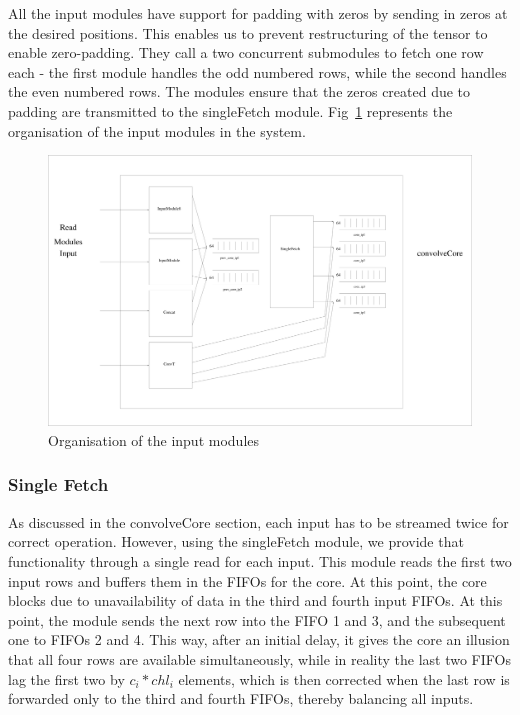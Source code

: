 \documentclass[a4paper,12pt, final]{report}
\begin{document}
All the input modules have support for padding with zeros by sending in zeros at the desired positions. This enables us to prevent restructuring of the tensor to enable zero-padding. They call a two concurrent submodules to fetch one row each - the first module handles the odd numbered rows, while the second handles the even numbered rows. The modules ensure that the zeros created due to padding are transmitted to the singleFetch module. Fig~\ref{fig:inputModules} represents the organisation of the input modules in the system.


\begin{figure}[h!]
    \centering
    \includegraphics[width=\textwidth]{inputModule.pdf}
    \caption{Organisation of the input modules}
    \label{fig:inputModules}
\end{figure}

\subsubsection{Single Fetch}

As discussed in the convolveCore section, each input has to be streamed twice for correct operation. However, using the singleFetch module, we provide that functionality through a single read for each input. This module reads the first two input rows and buffers them in the FIFOs for the core. At this point, the core blocks due to unavailability of data in the third and fourth input FIFOs. At this point, the module sends the next row into the FIFO 1 and 3, and the subsequent one to FIFOs 2 and 4. This way, after an initial delay, it gives the core an illusion that all four rows are available simultaneously, while in reality the last two FIFOs lag the first two by $c_i*chl_i$ elements, which is then corrected when the last row is forwarded only to the third and fourth FIFOs, thereby balancing all inputs.
\\
\end{document}
